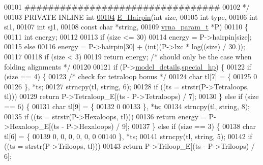 \begin{DoxyCode}
00101 \textcolor{comment}{ #################################}
00102 \textcolor{comment}{ */}
00103 PRIVATE INLINE \textcolor{keywordtype}{int}
\hyperlink{group__loops_gadf943ee9a45b7f4cee9192c06210dace}{00104} \hyperlink{group__loops_gadf943ee9a45b7f4cee9192c06210dace}{E\_Hairpin}(\textcolor{keywordtype}{int}           size,
00105           \textcolor{keywordtype}{int}           type,
00106           \textcolor{keywordtype}{int}           si1,
00107           \textcolor{keywordtype}{int}           sj1,
00108           \textcolor{keyword}{const} \textcolor{keywordtype}{char}    *\textcolor{keywordtype}{string},
00109           \hyperlink{group__energy__parameters_structvrna__param__s}{vrna\_param\_t}  *P)
00110 \{
00111   \textcolor{keywordtype}{int} energy;
00112 
00113   \textcolor{keywordflow}{if} (size <= 30)
00114     energy = P->hairpin[size];
00115   \textcolor{keywordflow}{else}
00116     energy = P->hairpin[30] + (int)(P->lxc * log((size) / 30.));
00117 
00118   \textcolor{keywordflow}{if} (size < 3)
00119     \textcolor{keywordflow}{return} energy;            \textcolor{comment}{/* should only be the case when folding alignments */}
00120 
00121   \textcolor{keywordflow}{if} (P->\hyperlink{group__energy__parameters_a7b84353eb9075c595bad4ceb871bcae7}{model\_details}.\hyperlink{group__model__details_add64a96d23e77ef1d0ddf8dfc5228143}{special\_hp}) \{
00122     \textcolor{keywordflow}{if} (size == 4) \{
00123       \textcolor{comment}{/* check for tetraloop bonus */}
00124       \textcolor{keywordtype}{char} tl[7] = \{
00125         0
00126       \}, *ts;
00127       strncpy(tl, \textcolor{keywordtype}{string}, 6);
00128       \textcolor{keywordflow}{if} ((ts = strstr(P->Tetraloops, tl)))
00129         \textcolor{keywordflow}{return} P->Tetraloop\_E[(ts - P->Tetraloops) / 7];
00130     \} \textcolor{keywordflow}{else} \textcolor{keywordflow}{if} (size == 6) \{
00131       \textcolor{keywordtype}{char} tl[9] = \{
00132         0
00133       \}, *ts;
00134       strncpy(tl, \textcolor{keywordtype}{string}, 8);
00135       \textcolor{keywordflow}{if} ((ts = strstr(P->Hexaloops, tl)))
00136         \textcolor{keywordflow}{return} energy = P->Hexaloop\_E[(ts - P->Hexaloops) / 9];
00137     \} \textcolor{keywordflow}{else} \textcolor{keywordflow}{if} (size == 3) \{
00138       \textcolor{keywordtype}{char} tl[6] = \{
00139         0, 0, 0, 0, 0, 0
00140       \}, *ts;
00141       strncpy(tl, \textcolor{keywordtype}{string}, 5);
00142       \textcolor{keywordflow}{if} ((ts = strstr(P->Triloops, tl)))
00143         \textcolor{keywordflow}{return} P->Triloop\_E[(ts - P->Triloops) / 6];

\end{DoxyCode}
